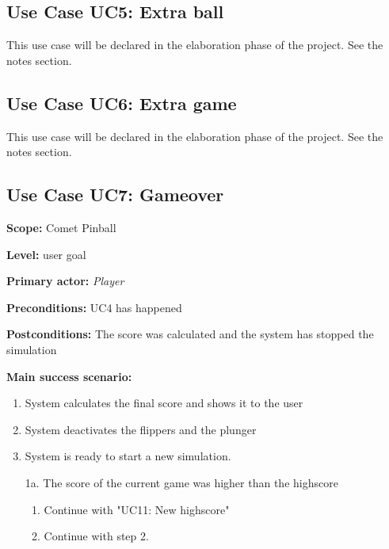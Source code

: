 \documentclass[fontsize=12pt,
               paper=a4,
               twoside=false,
               parskip=half,
               ]{scrartcl}
\begin{document}


\subsection{Use Case UC5: Extra ball}

This use case will be declared in the elaboration phase of the project. See the notes section.


\subsection{Use Case UC6: Extra game}

This use case will be declared in the elaboration phase of the project. See the notes section.


\subsection{Use Case UC7: Gameover}

\textbf{\textsf{Scope:}} Comet Pinball

\textbf{\textsf{Level:}} user goal

\textbf{\textsf{Primary actor:}} \emph{Player}

\textbf{\textsf{Preconditions:}} UC4 has happened

\textbf{\textsf{Postconditions:}} The score was calculated and the system has stopped the simulation

\textbf{\textsf{Main success scenario:}}

\begin{enumerate}[leftmargin=3em]
	\item System calculates the final score and shows it to the user
	\item System deactivates the flippers and the plunger
	\item System is ready to start a new simulation.
\end{enumerate}


\begin{itemize}[leftmargin=3em]
	\item[1a.]  The score of the current game was higher than the highscore
	\begin{enumerate}
		\item Continue with "UC11: New highscore"
		\item Continue with step 2.
	\end{enumerate}
\end{itemize}
\end{document}
